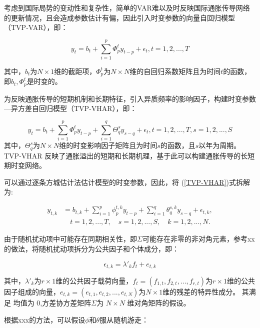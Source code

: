 \documentclass[12pt,a4paper]{article}
\begin{document}
考虑到国际局势的变动性和复杂性，简单的VAR难以及时反映国际通胀传导网络的更新情况，且会造成参数估计有偏，因此引入时变参数的向量自回归模型（TVP-VAR），即：

\begin{equation}
    y_t = b_t + \sum_{i=1}^{p} \Phi_{p}^t y_{t-p} + \epsilon_t  ,t=1,2,...,T
\end{equation}

其中，$b_t$为$N \times 1$维的截距项，$\Phi_{p}^t$为$N \times N$维的自回归系数矩阵且为时间$t$的函数，即$b_t,\Phi_{p}^t$是时变的。

为反映通胀传导的短期机制和长期特征，引入异质频率的影响因子，构建时变参数—异方差自回归模型（TVP-VHAR），即：

\begin{equation}\label{TVP-VHAR}
    y_t = b_t + \sum_{i=1}^{p} \Phi_{p}^t y_{t-p}  + \sum_{i=1}^{q} \Theta _{q}^s y_{s-q}+\epsilon_t,t=1,2,...,T,s=1,2,...,S
\end{equation}
其中，$\Theta_{q}^s$为$N \times N$维的时变影响因子矩阵且为时间$s$的函数，且$s$以年为周期。TVP-VHAR 反映了通胀溢出的短期和长期机理，基于此可以构建通胀传导的长短期时变网络。

可以通过逐条方城估计法估计模型的时变参数，因此，将 (\ref{TVP-VHAR})式拆解为:

\begin{equation}
    \begin{aligned}
        y_{t,k} &= b_{t,k} + \sum_{i=1}^{p} \phi_{p}^{t,k} y_{t-p} + \sum_{i=1}^{q} \theta _{q}^{s,k} y_{s-q}+\epsilon_{t,k}, \\
        &\quad t=1,2,...,T, \quad s=1,2,...,S, \quad k=1,2,...,N.
    \end{aligned}
\end{equation}

由于随机扰动项中可能存在同期相关性，即$\Sigma$可能存在非零的非对角元素，参考xx的做法，将随机扰动项拆分为公共因子和个体成分，即：

\begin{equation}
    \epsilon_{t,k} = \lambda'_kf_t+e_{t,k}
\end{equation}

其中，$\lambda'_k$为$r \times 1$维的公共因子载荷向量，$f_t=(f_{1,t},f_{2,t},...,f_{r,t})$为$r \times 1$维的公共因子组成的向量，$e_{t,k}=(e_{t,1},e_{t,2},...,e_{t,N})$为$N \times 1$维的残差的特异性成分。
其满足  均值为 0,方差协方差矩阵$\Sigma$为 $N × N$ 维对角矩阵的假设。

根据xxx的方法，可以假设$\phi$和$\theta$服从随机游走：
\end{document}
